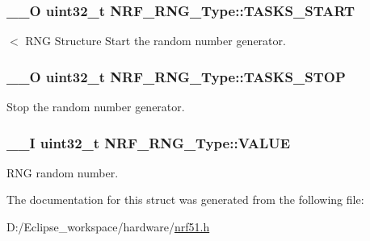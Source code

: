 \subsubsection[{T\+A\+S\+K\+S\+\_\+\+S\+T\+A\+R\+T}]{\setlength{\rightskip}{0pt plus 5cm}\+\_\+\+\_\+\+O uint32\+\_\+t N\+R\+F\+\_\+\+R\+N\+G\+\_\+\+Type\+::\+T\+A\+S\+K\+S\+\_\+\+S\+T\+A\+R\+T}\label{struct_n_r_f___r_n_g___type_ab230b275569d1d413d82be966086e4ae}
$<$ R\+N\+G Structure Start the random number generator. \hypertarget{struct_n_r_f___r_n_g___type_a9c451c9b86ef8b05e56ac6d5c05ebc91}{}
\subsubsection[{T\+A\+S\+K\+S\+\_\+\+S\+T\+O\+P}]{\setlength{\rightskip}{0pt plus 5cm}\+\_\+\+\_\+\+O uint32\+\_\+t N\+R\+F\+\_\+\+R\+N\+G\+\_\+\+Type\+::\+T\+A\+S\+K\+S\+\_\+\+S\+T\+O\+P}\label{struct_n_r_f___r_n_g___type_a9c451c9b86ef8b05e56ac6d5c05ebc91}
Stop the random number generator. \hypertarget{struct_n_r_f___r_n_g___type_a2c8c3bc1f4a5841d4e869abc12d1efd9}{}
\subsubsection[{V\+A\+L\+U\+E}]{\setlength{\rightskip}{0pt plus 5cm}\+\_\+\+\_\+\+I uint32\+\_\+t N\+R\+F\+\_\+\+R\+N\+G\+\_\+\+Type\+::\+V\+A\+L\+U\+E}\label{struct_n_r_f___r_n_g___type_a2c8c3bc1f4a5841d4e869abc12d1efd9}
R\+N\+G random number. 

The documentation for this struct was generated from the following file\+:\begin{DoxyCompactItemize}
\item 
D\+:/\+Eclipse\+\_\+workspace/hardware/\hyperlink{nrf51_8h}{nrf51.\+h}\end{DoxyCompactItemize}
